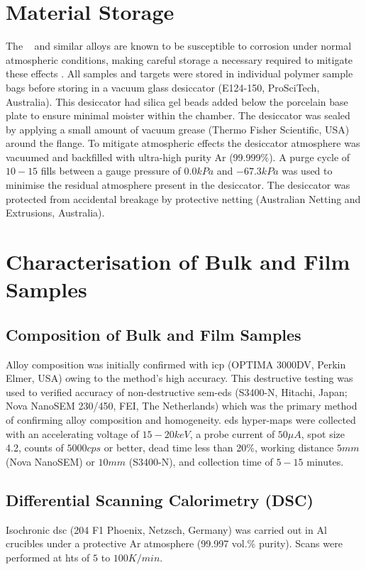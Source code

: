 \section{Material Storage}
The \MgZnCa~ and similar alloys are known to be susceptible to corrosion under normal atmospheric conditions, making careful storage a necessary required to mitigate these effects \cite{Cao2013, Wang2012, Zberg2009}. All samples and targets were stored in individual polymer sample bags before storing in a vacuum glass desiccator (E124-150, ProSciTech, Australia). This desiccator had silica gel beads added below the porcelain base plate to ensure minimal moister within the chamber. The desiccator was sealed by applying a small amount of vacuum grease (Thermo Fisher Scientific, USA) around the flange. To mitigate atmospheric effects the desiccator atmosphere was vacuumed and backfilled with ultra-high purity Ar (99.999\%). A purge cycle of $10 - 15$ fills between a gauge pressure of $0.0 kPa$ and $-67.3 kPa$ was used to minimise the residual atmosphere present in the desiccator. The desiccator was protected from accidental breakage by protective netting (Australian Netting and Extrusions, Australia).

\section{Characterisation of Bulk and Film Samples}

\subsection{Composition of Bulk and Film Samples}
Alloy composition was initially confirmed with \gls{icp} (OPTIMA 3000DV, Perkin Elmer, USA) owing to the method's high accuracy. This destructive testing was used to verified accuracy of non-destructive \gls{sem}-\gls{eds} (S3400-N, Hitachi, Japan; Nova NanoSEM 230/450, FEI, The Netherlands) which was the primary method of confirming alloy composition and homogeneity. \Gls{eds} hyper-maps were collected with an accelerating voltage of $15-20keV$, a probe current of $50 \mu A$, spot size 4.2, counts of $5000cps$ or better, dead time less than 20\%, working distance $5mm$ (Nova NanoSEM) or $10mm$ (S3400-N), and collection time of $5-15$ minutes.

\subsection{Differential Scanning Calorimetry (DSC)}
Isochronic \gls{dsc} (204 F1 Phoenix, Netzsch, Germany) was carried out in Al crucibles under a protective Ar atmosphere (99.997 vol.\% purity). Scans were performed at \glspl{ht} of $5$ to $100 K/min$. 

